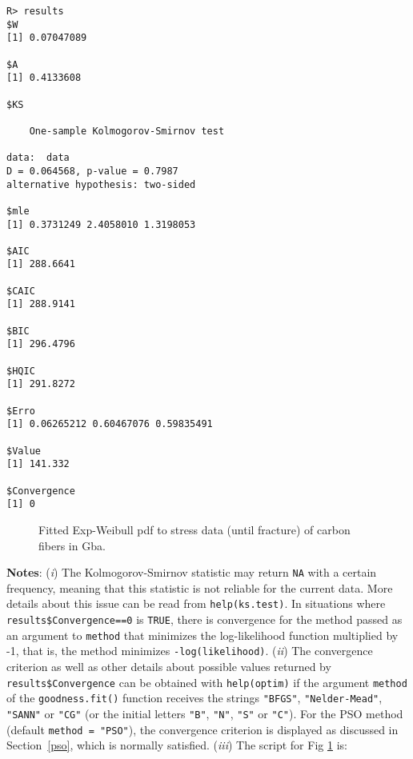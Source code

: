\documentclass[10pt,letterpaper]{article}
\begin{document}
\begin{verbatim}
R> results
$W
[1] 0.07047089
		
$A
[1] 0.4133608
		
$KS
		
	One-sample Kolmogorov-Smirnov test
		
data:  data
D = 0.064568, p-value = 0.7987
alternative hypothesis: two-sided
		
$mle
[1] 0.3731249 2.4058010 1.3198053
		
$AIC
[1] 288.6641
		
$CAIC
[1] 288.9141
		
$BIC
[1] 296.4796
		
$HQIC
[1] 291.8272
		
$Erro
[1] 0.06265212 0.60467076 0.59835491
		
$Value
[1] 141.332
		
$Convergence
[1] 0
\end{verbatim}

\begin{figure}[H]
\centering
\caption{Fitted Exp-Weibull pdf to stress data (until fracture) of carbon fibers in Gba.}
\label{plot_ajustament}
\end{figure}


\hspace{-0.6cm}

\textbf{Notes}: ({\it i}) The Kolmogorov-Smirnov statistic may return \texttt{NA} with a certain frequency,
meaning  that this statistic is not reliable for the current data.
More details about this issue can be read from \texttt{help(ks.test)}.
In situations where \texttt{results\$Convergence==0} is \texttt{TRUE}, there is convergence for the method passed as an argument
to \texttt{method} that minimizes the log-likelihood function multiplied by -1, that is, the method minimizes \texttt{-log(likelihood)}.
({\it ii}) The convergence criterion as well as other details about possible values returned by \texttt{results\$Convergence}
can be obtained with \texttt{help(optim)} if the argument \texttt{method} of the \texttt{goodness.fit()} function receives
the strings \texttt{"BFGS"}, \texttt{"Nelder-Mead"}, \texttt{"SANN"} or \texttt{"CG"} (or the initial letters \texttt{"B"}, \texttt{"N"}, \texttt{"S"} or \texttt{"C"}).
For the PSO method  (default \texttt{method = "PSO"}), the convergence criterion is displayed as discussed in Section~\ref{pso}, which is normally  satisfied.
({\it iii}) The script for Fig \ref{plot_ajustament} is:
\end{document}
